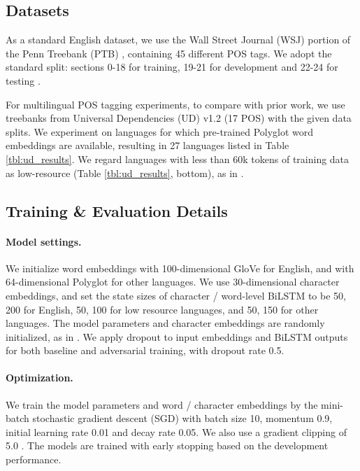 \documentclass[11pt,a4paper]{article}
\begin{document}
\subsection{Datasets}
As a standard English dataset, we use the Wall Street Journal (WSJ) portion of the Penn Treebank (PTB) \cite{Marcus:1993:BLA:972470.972475}, containing 45 different POS tags.
We adopt the standard split: sections 0-18 for training, 19-21 for development and 22-24 for testing \cite{Collins2002,Manning:2011:from97to100}.


For multilingual POS tagging experiments,
to compare with prior work,
we use treebanks from Universal Dependencies (UD) v1.2 \cite{11234/1-1548} (17 POS) with the given data splits.
We experiment on languages for which pre-trained Polyglot word embeddings \cite{polyglot:2013:ACL-CoNLL} are available, resulting in 27 languages listed in Table \ref{tbl:ud_results}.
We regard languages with less than 60k tokens of training data as low-resource (Table \ref{tbl:ud_results}, bottom), as in .

\subsection{Training \& Evaluation Details}

\paragraph{Model settings.}

We initialize word embeddings with 100-dimensional GloVe \cite{pennington-socher-manning:2014:EMNLP2014} for English, and with 64-dimensional Polyglot \cite{polyglot:2013:ACL-CoNLL} for other languages.
We use 30-dimensional character embeddings, and set the state sizes of character \!/\! word-level BiLSTM to be 50, 200  for English, 50, 100 for low resource languages, and 50, 150 for other languages. The model parameters and character embeddings are randomly initialized, 
as in
.
We apply dropout \cite{JMLR:v15:srivastava14a} to input embeddings and BiLSTM outputs for both baseline and adversarial training, with dropout rate 0.5.


\paragraph{Optimization.}
We train the model parameters and word \!/\! character embeddings by the mini-batch stochastic gradient descent (SGD) with batch size 10, momentum 0.9, initial learning rate 0.01 and decay rate 0.05. 
We also use a gradient clipping of 5.0 \cite{Pascanu2012}.
The models are trained with
early stopping \cite{caruana2001overfitting} based on the development performance.
\end{document}
